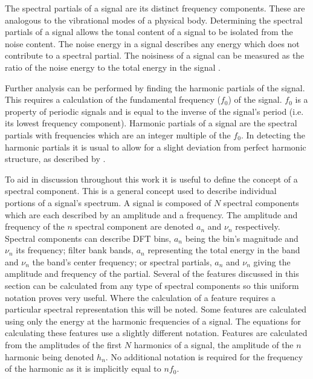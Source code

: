 		The spectral partials of a signal are its distinct frequency components. These are analogous to the
		vibrational modes of a physical body. Determining the spectral partials of a signal allows the tonal
		content of a signal to be isolated from the noise content. The noise energy in a signal describes any
		energy which does not contribute to a spectral partial. The noisiness of a signal can be measured as the
		ratio of the noise energy to the total energy in the signal \citep{serra1998sound}.

		Further analysis can be performed by finding the harmonic partials of the signal. This requires a
		calculation of the fundamental frequency ($f_{0}$) of the signal. $f_{0}$ is a property of periodic signals
		and is equal to the inverse of the signal's period (i.e. its lowest frequency component). Harmonic partials
		of a signal are the spectral partials with frequencies which are an integer multiple of the $f_{0}$. In
		detecting the harmonic partials it is usual to allow for a slight deviation from perfect harmonic
		structure, as described by \citet{peeters2011the}.

		To aid in discussion throughout this work it is useful to define the concept of a spectral component. This
		is a general concept used to describe individual portions of a signal's spectrum. A signal is composed of
		$N$ spectral components which are each described by an amplitude and a frequency. The amplitude and
		frequency of the $n$ spectral component are denoted $a_{n}$ and $\nu_{n}$ respectively. Spectral
		components can describe DFT bins, $a_{n}$ being the bin's magnitude and $\nu_{n}$ its frequency; filter
		bank bands, $a_{n}$ representing the total energy in the band and $\nu_{n}$ the band's center frequency; or
		spectral partials, $a_{n}$ and $\nu_{n}$ giving the amplitude and frequency of the partial. Several of the
		features discussed in this section can be calculated from any type of spectral components so this uniform
		notation proves very useful. Where the calculation of a feature requires a particular spectral
		representation this will be noted. Some features are calculated using only the energy at the harmonic
		frequencies of a signal. The equations for calculating these features use a slightly different notation.
		Features are calculated from the amplitudes of the first $N$ harmonics of a signal, the amplitude of the
		$n$ harmonic being denoted $h_{n}$. No additional notation is required for the frequency of the
		harmonic as it is implicitly equal to $nf_{0}$.

